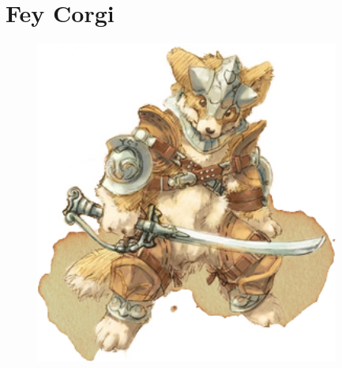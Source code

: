 \section{Fey Corgi}

\begin{figure}
   \vspace*{-3.5cm}
\end{figure}


\begin{figure}
   \hspace*{-10cm}
   \includegraphics[width=10cm]{2-Razze/2.2-FeyCorgi/Risorse/fey_corgi2.png}
\end{figure}

